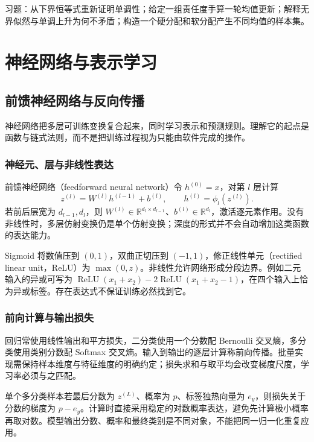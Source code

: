 \documentclass[UTF8,12pt,a4paper,fontset=fandol]{ctexbook}
\begin{document}
习题：从下界恒等式重新证明单调性；给定一组责任度手算一轮均值更新；解释无界似然与单调上升为何不矛盾；构造一个硬分配和软分配产生不同均值的样本集。

\part{神经网络与表示学习}

\chapter{前馈神经网络与反向传播}
\label{chap:ml-networks}

神经网络把多层可训练变换复合起来，同时学习表示和预测规则。理解它的起点是函数与链式法则，而不是把训练过程视为只能由软件完成的操作。

\section{神经元、层与非线性表达}

前馈神经网络（feedforward neural network）令 $h^{(0)}=x$，对第 $l$ 层计算
\begin{equation}
 z^{(l)}=W^{(l)}h^{(l-1)}+b^{(l)},\qquad
 h^{(l)}=\phi_l(z^{(l)}).
 \label{eq:ml-network-forward}
\end{equation}
若前后层宽为 $d_{l-1},d_l$，则 $W^{(l)}\in\mathbb R^{d_l\times d_{l-1}}$、$b^{(l)}\in\mathbb R^{d_l}$，激活逐元素作用。没有非线性时，多层仿射变换仍是单个仿射变换；深度的形式并不会自动增加这类函数的表达能力。

Sigmoid 将数值压到 $(0,1)$，双曲正切压到 $(-1,1)$，修正线性单元（rectified linear unit，ReLU）为 $\max(0,z)$。非线性允许网络形成分段边界。例如二元输入的异或可写为 $\operatorname{ReLU}(x_1+x_2)-2\operatorname{ReLU}(x_1+x_2-1)$，在四个输入上恰为异或标签。存在表达式不保证训练必然找到它。

\section{前向计算与输出损失}

回归常使用线性输出和平方损失，二分类使用一个分数配 Bernoulli 交叉熵，多分类使用类别分数配 Softmax 交叉熵。输入到输出的逐层计算称前向传播。批量实现需保持样本维度与特征维度的明确约定；损失求和与取平均会改变梯度尺度，学习率必须与之匹配。

单个多分类样本若最后分数为 $z^{(L)}$、概率为 $p$、标签独热向量为 $e_y$，则损失关于分数的梯度为 $p-e_y$。计算时直接采用稳定的对数概率表达，避免先计算极小概率再取对数。模型输出分数、概率和最终类别是不同对象，不能把同一归一化重复应用。
\end{document}
